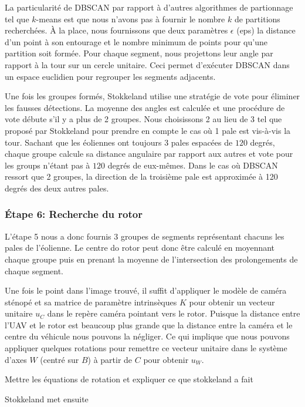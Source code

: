 La particularité de DBSCAN par rapport à d'autres algorithmes de partionnage tel que $k$-means est que nous n'avons pas à fournir le nombre $k$ de partitions recherchées. À la place, nous fournissons que deux paramètres $\epsilon$ (eps) la distance d'un point à son entourage et  le nombre minimum de points pour qu'une partition soit formée. Pour chaque segment, nous projettons leur angle par rapport à la tour sur un cercle unitaire. Ceci permet d'exécuter DBSCAN dans un espace euclidien pour regrouper les segments adjacents.

Une fois les groupes formés, Stokkeland utilise une stratégie de vote pour éliminer les fausses détections. La moyenne des angles est calculée et une procédure de vote débute s'il y a plus de 2 groupes. Nous choisissons 2 au lieu de 3 tel que proposé par Stokkeland pour prendre en compte le cas où 1 pale est vis-à-vis la tour. Sachant que les éoliennes ont toujours 3 pales espacées de $120$ degrés, chaque groupe calcule sa distance angulaire par rapport aux autres et vote pour les groups n'étant pas à $120$ degrés de eux-mêmes. Dans le cas où DBSCAN ressort que 2 groupes, la direction de la troisième pale est approximée à 120 degrés des deux autres pales.

\subsubsection{Étape 6: Recherche du rotor}

L'étape 5 nous a donc fournis 3 groupes de segments représentant chacuns les pales de l'éolienne. Le centre do rotor peut donc être calculé en moyennant chaque groupe puis en prenant la moyenne de l'intersection des prolongements de chaque segment.

Une fois le point dans l'image trouvé, il suffit d'appliquer le modèle de caméra sténopé et sa matrice de paramètre intrinsèques $K$ pour obtenir un vecteur unitaire $u_C$ dans le repère caméra pointant vers le rotor. Puisque la distance entre l'UAV et le rotor est beaucoup plus grande que la distance entre la caméra et le centre du véhicule nous pouvons la négliger. Ce qui implique que nous pouvons appliquer quelques rotations pour remettre ce vecteur unitaire dans le système d'axes $W$ (centré sur $B$) à partir de $C$ pour obtenir $u_W$.

\color{red}
Mettre les équations de rotation et expliquer ce que stokkeland a fait
\color{black}

Stokkeland met ensuite

